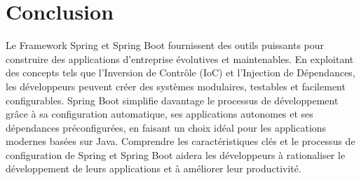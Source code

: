 \documentclass{article}
\begin{document}
\section{Conclusion}

Le Framework Spring et Spring Boot fournissent des outils puissants pour construire des applications d'entreprise évolutives et maintenables. En exploitant des concepts tels que l'Inversion de Contrôle (IoC) et l'Injection de Dépendances, les développeurs peuvent créer des systèmes modulaires, testables et facilement configurables. Spring Boot simplifie davantage le processus de développement grâce à sa configuration automatique, ses applications autonomes et ses dépendances préconfigurées, en faisant un choix idéal pour les applications modernes basées sur Java. Comprendre les caractéristiques clés et le processus de configuration de Spring et Spring Boot aidera les développeurs à rationaliser le développement de leurs applications et à améliorer leur productivité.
\end{document}
